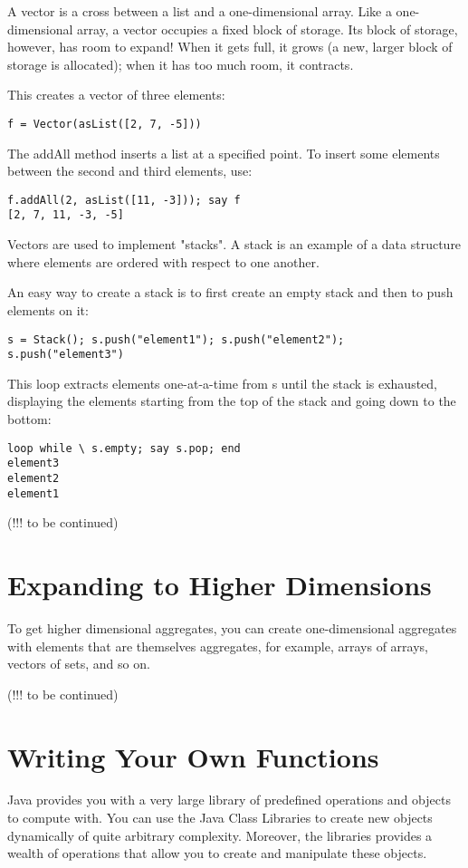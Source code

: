 A vector is a cross between a list and a one-dimensional array. Like a one-dimensional array, a vector occupies a fixed block of storage. Its block of storage, however, has room to expand! When it gets full, it grows (a new, larger block of storage is allocated); when it has too much room, it contracts.

This creates a vector of three elements:

\begin{verbatim}
f = Vector(asList([2, 7, -5]))
\end{verbatim}
The addAll method inserts a list at a specified point. To insert some elements between the second and third elements, use:

\begin{verbatim}
f.addAll(2, asList([11, -3])); say f
[2, 7, 11, -3, -5]
\end{verbatim}
Vectors are used to implement "stacks". A stack is an example of a data structure where elements are ordered with respect to one another.

An easy way to create a stack is to first create an empty stack and then to push elements on it:

\begin{verbatim}
s = Stack(); s.push("element1"); s.push("element2"); s.push("element3")
\end{verbatim}
This loop extracts elements one-at-a-time from s until the stack is exhausted, displaying the elements starting from the top of the stack and going down to the bottom:
\begin{verbatim}
loop while \ s.empty; say s.pop; end
element3
element2
element1
\end{verbatim}
(!!! to be continued)

\section{Expanding to Higher Dimensions}

To get higher dimensional aggregates, you can create one-dimensional aggregates with elements that are themselves aggregates, for example, arrays of arrays, vectors of sets, and so on.

(!!! to be continued)

\section{Writing Your Own Functions}

Java provides you with a very large library of predefined operations and objects to compute with. You can use the Java Class Libraries to create new objects dynamically of quite arbitrary complexity. Moreover, the libraries provides a wealth of operations that allow you to create and manipulate these objects.

